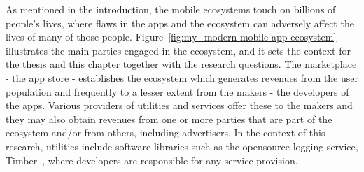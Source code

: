 As mentioned in the introduction, the mobile ecosystems touch on billions of people's lives, where flaws in the apps and the ecosystem can adversely affect the lives of many of those people. Figure~\ref{fig:my_modern-mobile-app-ecosystem} illustrates the main parties engaged in the ecosystem, %
and it sets the context for the thesis and this chapter together with the research questions. The marketplace - the app store - establishes the ecosystem which generates revenues from the user population and frequently to a lesser extent from the makers -  the developers of the apps. Various providers of utilities and services offer these to the makers and they may also obtain revenues from one or more parties that are part of the ecosystem and/or from others, including advertisers. In the context of this research, utilities include software libraries such as the opensource logging service, Timber~, where developers are responsible for any service provision. 
